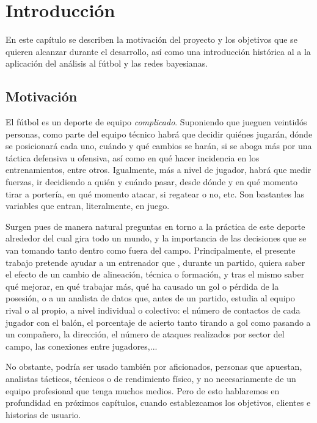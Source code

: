\chapter{Introducción}

En este capítulo se describen la motivación del proyecto y los objetivos que
se quieren alcanzar durante el desarrollo, así como una introducción histórica al
a la aplicación del análisis al fútbol y las redes bayesianas. 

\section{Motivación}

El fútbol es un deporte de equipo  \textit{complicado}. Suponiendo que jueguen veintidós personas, como parte del equipo técnico habrá que decidir quiénes jugarán, dónde se posicionará cada uno, cuándo y qué cambios se harán, si se aboga más por una táctica defensiva u ofensiva, así como en qué hacer incidencia en los entrenamientos, entre otros. Igualmente, más a nivel de jugador, habrá que medir fuerzas, ir decidiendo a quién y cuándo pasar, desde dónde y en qué momento tirar a portería, en qué momento atacar, si regatear o no, etc. Son bastantes las variables que entran, literalmente, en juego. 

Surgen pues de manera natural preguntas en torno a la práctica de este deporte alrededor del cual gira todo un mundo, y la importancia de las decisiones que se van tomando tanto dentro como fuera del campo. Principalmente,  el presente trabajo pretende ayudar a un entrenador que , durante un partido, quiera saber el efecto de un cambio de alineación, técnica o formación, y tras el mismo saber qué mejorar, en qué trabajar más, qué ha causado un gol o pérdida de la posesión, o a un analista de datos que, antes de un partido, estudia al equipo rival o al propio, a nivel individual o colectivo: el número de contactos de cada jugador con el balón, el porcentaje de acierto tanto tirando a gol como pasando a un compañero, la dirección, el número de ataques realizados por sector del campo, las conexiones entre jugadores,...

No obstante, podría ser usado también por aficionados, personas que apuestan, analistas tácticos, técnicos o de rendimiento físico, y no necesariamente de un equipo profesional que tenga muchos medios. Pero de esto hablaremos en profundidad en próximos capítulos, cuando establezcamos los objetivos, clientes e historias de usuario.

